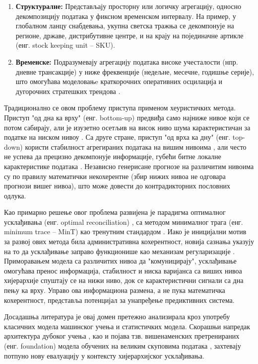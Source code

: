 \documentclass[12pt,oneside]{memoir}
\begin{document}
\begin{enumerate}
\item \textbf{Структуралне:} Представљају просторну или логичку агрегацију, односно декомпозицију података у фиксном временском интервалу. На пример, у глобалном ланцу снабдевања, укупна светска тражња се декомпонује на регионе, државе, дистрибутивне центре, и на крају на појединачне артикле (енг. stock keeping unit – SKU).
\item \textbf{Временске:} Подразумевају агрегацију података високе учесталости (нпр. дневне трансакције) у ниже фреквенције (недељне, месечне, годишње серије), што омогућава моделовањe краткорочних оперативних осцилација и дугорочних стратешких трендова \cite{athanasopoulos2017forecasting}.
\end{enumerate}

Традиционално се овом проблему приступа применом хеуристичких метода. Приступ "од дна ка врху" (енг. bottom-up) предвиђа само најниже нивое који се потом сабирају, али је изузетно осетљив на висок ниво шума карактеристичан за податке на ниском нивоу  \cite{dangerfield1992bottom}. Са друге стране, приступ "од врха ка дну" (енг. top-down) користи стабилност агрегираних података на вишим нивоима \cite{gross1990disaggregation}, али често не успева да прецизно декомпонује информације, губећи битне локалне карактеристике података \cite{athanasopoulos2009hierarchical}. Независно генерисане прогнозе на различитим нивоима су по правилу математички некохерентне (збир нижих нивоа не одговара прогнози вишег нивоа), што може довести до контрадикторних пословних одлука.

Као примарно решење овог проблема развијена је парадигма оптималног усклађивања (енг. optimal reconciliation) \cite{hyndman2011optimal}, са методом минималног трага (енг. minimum trace – MinT) као тренутним стандардом \cite{wickramasuriya2019optimal}. Иако је иницијални мотив за развој ових метода била административна кохерентност, новија сазнања указују на то да усклађивање заправо функционише као механизам регуларизације \cite{kourentzes2019cross}. Приморавањем модела са различитих нивоа да "комуницирају", усклађивање омогућава пренос информација, стабилност и ниска варијанса са виших нивоа хијерархије спуштају се на нижи ниво, док се карактеристични сигнали са дна пењу ка врху. Управо ова информациона размена, а не пука математичка кохерентност, представља потенцијал за унапређење предиктивних система.

Досадашња литература је овај домен претежно анализирала кроз употребу класичних модела машинског учења и статистичких модела. Скорашњи напредак архитектура дубоког учења \cite{lim2021temporal, oreshkin2019nbeats}, као и појава тзв. вишенаменских претренираних (енг. foundation) модела обучених на великим скуповима података \cite{ansari2024chronos, das2023timesfm}, захтевају потпуно нову евалуацију у контексту хијерархијског усклађивања.
\end{document}
